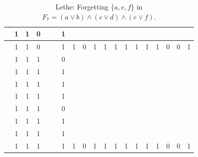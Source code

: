 \begin{table}[!tb]
\begin{tabular}{|c|c|c|c|c|c|c|c|c|c|c|c|c|c|c|c|c|c|c|}
        \rowcolor{blue!40}  & 1 & 1 & 0 &  &  & 1 &  &  &  &  &  &  &  &  &  &  &  &  \\ \hline
        \rowcolor{blue!40}  & 1 & 1 & 0 &  &  & 1 & 1 & 0 & 1 & 1 & 1 & 1 & 1 & 1 & 1 & 0 & 0 & 1 \\ \hline
        \rowcolor{red!40}  & 1 & 1 & 1 &  &  & 0 &  &  &  &  &  &  &  &  &  &  &  &  \\ \hline
        \rowcolor{red!40}  & 1 & 1 & 1 &  &  & 1 &  &  &  &  &  &  &  &  &  &  &  &  \\ \hline
        \rowcolor{red!40}  & 1 & 1 & 1 &  &  & 1 &  &  &  &  &  &  &  &  &  &  &  &  \\ \hline
        \rowcolor{red!40}  & 1 & 1 & 1 &  &  & 1 &  &  &  &  &  &  &  &  &  &  &  &  \\ \hline
        \rowcolor{red!40}  & 1 & 1 & 1 &  &  & 0 &  &  &  &  &  &  &  &  &  &  &  &  \\ \hline
        \rowcolor{red!40}  & 1 & 1 & 1 &  &  & 1 &  &  &  &  &  &  &  &  &  &  &  &  \\ \hline
        \rowcolor{red!40}  & 1 & 1 & 1 &  &  & 1 &  &  &  &  &  &  &  &  &  &  &  &  \\ \hline
        \rowcolor{red!40}  & 1 & 1 & 1 &  &  & 1 & 1 & 0 & 1 & 1 & 1 & 1 & 1 & 1 & 1 & 0 & 0 & 1 \\ \hline
    \end{tabular}
    \caption{Lethe: Forgetting $\{a, e, f\}$ in $F_{7} = (a \lor b) \land (c \lor d) \land (e \lor f)$.}
    \label{tab:lethe-F7-aef}
\end{table}
